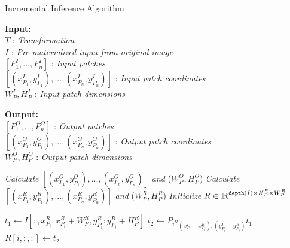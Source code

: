 \begin{algorithm}
    \caption{Incremental Inference Algorithm}\label{euclid}
    \label{alg:incinference}
    \begin{flushleft}
     \hspace*{4mm} \textbf{Input:} \\
     \hspace*{8mm} $T$ : \textit{Transformation}\\
     \hspace*{8mm} $I$ : \textit{Pre-materialized input from original image}\\
     \hspace*{8mm} $[P^I_1,...,P^I_n]$ : \textit{Input patches}\\
     \hspace*{8mm} $[(x^I_{P_1},y^I_{P_1}),...,(x^I_{P_n},y^I_{P_n})]$ : \textit{Input patch coordinates}\\
     \hspace*{8mm} $W^I_P,H^I_P$ : \textit{Input patch dimensions}
    \end{flushleft}

	\begin{flushleft}
     \hspace*{4mm} \textbf{Output:}\\
     \hspace*{8mm} $[P^O_1,...,P^O_n]$ : \textit{Output patches}\\
     \hspace*{8mm} $[(x^O_{P_1},y^O_{P_1}),...,(x^O_{P_n},y^O_{P_n})]$ : \textit{Output patch coordinates}\\
     \hspace*{8mm} $W^O_P,H^O_P$ : \textit{Output patch dimensions}
    \end{flushleft}

    \begin{algorithmic}[1]
    \State \textit{Calculate} $[(x^O_{P_1},y^O_{P_1}),...,(x^O_{P_n},y^O_{P_n})]$ \textit{and} ($W^O_P,H^O_P$)
    \State \textit{Calculate} $[(x^R_{P_1},y^R_{P_1}),...,(x^R_{P_n},y^R_{P_n})]$ \textit{and} ($W^R_P,H^R_P$)
    \State \textit{Initialize} $R \in \mathcal{\rm I\!R}^{\texttt{depth}(I) \times H^R_P \times W^R_P}$

    \label{alg:line:memcpy_loop}
    	\State $t_1 \gets I[:,x^R_{P_i}:x^R_{P_i}+W^R_P,y^R_{P_i}:y^R_{P_i}+H^R_P]$ 
    	\State $t_2 \gets P_i \bm\circ_{(x^I_{P_i}-x^R_{P_i}),(y^I_{P_i}-y^R_{P_i})} t_1$
    	\State $R[i,:,:] \gets t_2$
    \EndFor


\end{algorithmic}
\end{algorithm}

